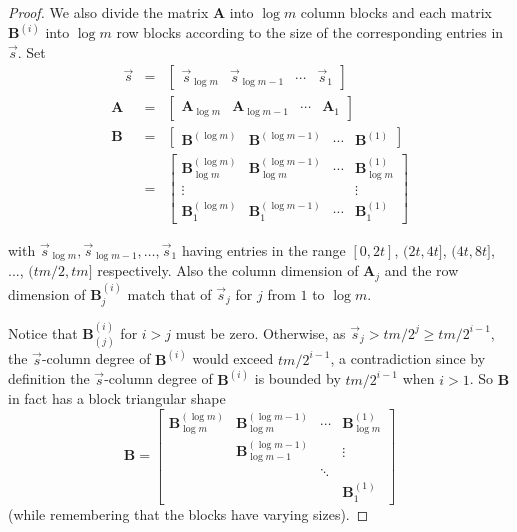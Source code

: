 \begin{proof}
We also divide the matrix $\mathbf{A}$ into $\log m$ column blocks
and each matrix $\mathbf{B}^{\left(i\right)}$ into $\log m$ row
blocks according to the size of the corresponding entries in $\vec{s}$.
Set 
\begin{eqnarray*}
~~~~\vec{s} & = & \left[\begin{array}{cccc}
\vec{s}_{\log m} & \vec{s}_{\log m-1} & \cdots & \vec{s}_{1}\end{array}\right]\\
\mathbf{A} & = & \left[\begin{array}{cccc}
\mathbf{A}_{\log m} & \mathbf{A}_{\log m-1} & \cdots & \mathbf{A}_{1}\end{array}\right]\\
\mathbf{B} & = & \left[\begin{array}{cccc}
\mathbf{B}^{\left(\log m\right)} & \mathbf{B}^{\left(\log m-1\right)} & \cdots & \mathbf{B}^{\left(1\right)}\end{array}\right]\\
 & = & \left[\begin{array}{cccc}
\mathbf{B}_{\log m}^{\left(\log m\right)} & \mathbf{B}_{\log m}^{\left(\log m-1\right)} & \cdots & \mathbf{B}_{\log m}^{\left(1\right)}\\
\vdots &  &  & \vdots\\
\mathbf{B}_{1}^{\left(\log m\right)} & \mathbf{B}_{1}^{\left(\log m-1\right)} & \cdots & \mathbf{B}_{1}^{\left(1\right)}
\end{array}\right]
\end{eqnarray*}
\begin{comment}
\wei{Shouldn't they be reversed? We are not assign to $\vec{s},\mathbf{A},\mathbf{B},$
but to $\vec{s}_{i},\mathbf{A}_{i},\mathbf{B}_{i}$. Same issue with
other assignments as well} \george{I think it is more readable this
way.} 
\end{comment}
with $\vec{s}_{\log m},\vec{s}_{\log m-1},\dots,\vec{s}_{1}$ having
entries in the range $\left[0,2t\right]$, $(2t,4t]$, $(4t,8t]$,
..., $(tm/2,tm]$ respectively. Also the column dimension of $\mathbf{A}_{j}$
and the row dimension of $\mathbf{B}_{j}^{\left(i\right)}$ match
that of $\vec{s}_{j}$ for $j$ from $1$ to $\log m$.

Notice that $\mathbf{B}_{(j)}^{(i)}$ for $i>j$ must be zero. Otherwise,
as $\vec{s}_{j}>tm/2^{j}\ge tm/2^{i-1}$, the $\vec{s}$-column degree
of $\mathbf{B}^{(i)}$ would exceed $tm/2^{i-1}$, a contradiction
since by definition the $\vec{s}$-column degree of $\mathbf{B}^{(i)}$
is bounded by $tm/2^{i-1}$ when $i>1$. So $\mathbf{B}$ in fact
has a block triangular shape 
\[
\mathbf{B}=\left[\begin{array}{cccc}
\mathbf{B}_{\log m}^{\left(\log m\right)} & \mathbf{B}_{\log m}^{\left(\log m-1\right)} & \cdots & \mathbf{B}_{\log m}^{\left(1\right)}\\
 & \mathbf{B}_{\log m-1}^{\left(\log m-1\right)} &  & \vdots\\
 &  & \ddots\\
 &  &  & \mathbf{B}_{1}^{\left(1\right)}
\end{array}\right]
\]
 (while remembering that the blocks have varying sizes).


\end{proof}
